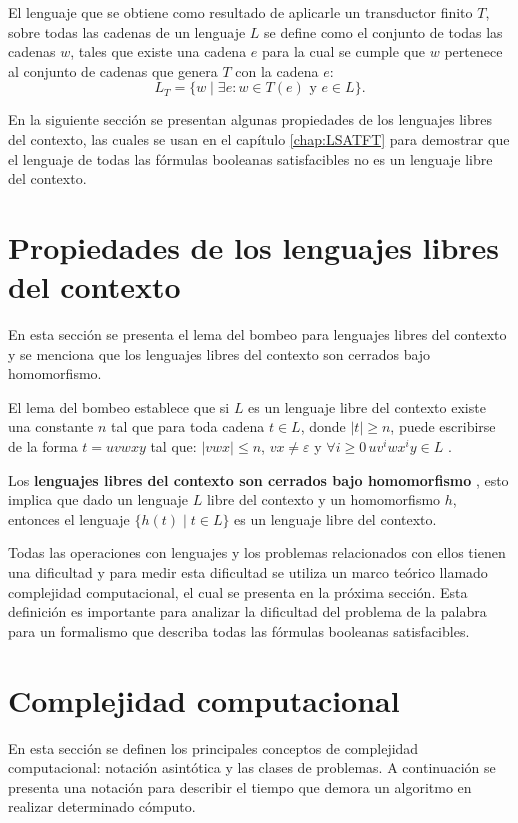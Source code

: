 El lenguaje que se obtiene como resultado de aplicarle un transductor finito $T$, sobre todas las cadenas de un lenguaje $L$ se define como
el conjunto de todas las cadenas $w$, tales que existe una cadena $e$ para la cual se cumple que $w$ pertenece al conjunto de cadenas
que genera $T$ con la cadena $e$:
$$L_T=\{w\mid \exists e: w\in T(e) \text{ y }e\in L\}.$$

En la siguiente sección se presentan algunas propiedades de los lenguajes libres del contexto, 
las cuales se usan en el capítulo \ref{chap:LSATFT} para demostrar que el lenguaje 
de todas las fórmulas booleanas satisfacibles no es un lenguaje
libre del contexto.

\section{Propiedades de los lenguajes libres del contexto}

En esta sección se presenta el lema del bombeo para lenguajes libres del contexto y se menciona que los lenguajes 
libres del contexto son cerrados bajo homomorfismo.

El lema del bombeo establece que si $L$ es un lenguaje libre del contexto
existe una constante $n$ tal que para toda cadena $t\in L$, donde $|t|\geq n$, puede escribirse de la forma $t=uvwxy$ tal que:
$|vwx|\leq n$, $vx\neq \varepsilon$ y $\forall i\geq 0\,uv^iwx^iy\in L$ \cite{authomataTheory}.

Los \textbf{lenguajes libres del contexto son cerrados bajo homomorfismo} \cite{authomataTheory}, esto
implica que dado un lenguaje $L$ libre del contexto y un homomorfismo $h$, entonces el lenguaje
$\{h(t)\mid t\in L\}$ es un lenguaje libre del contexto.


Todas las operaciones con lenguajes y los problemas relacionados con ellos tienen una dificultad y para medir esta dificultad
se utiliza un marco teórico llamado complejidad computacional, el cual se presenta en la próxima sección. Esta definición
es importante para analizar la dificultad del problema de la palabra para un formalismo que describa todas las fórmulas booleanas
satisfacibles.

\section{Complejidad computacional}

En esta sección se definen los principales conceptos de complejidad computacional: notación asintótica y las clases de problemas. A continuación se presenta una notación para describir el tiempo que demora un algoritmo en realizar determinado cómputo.

